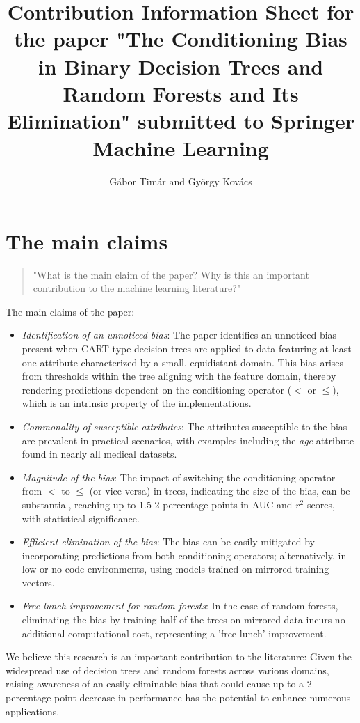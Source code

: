 \documentclass{article}
\title{Contribution Information Sheet for the paper "The Conditioning Bias in Binary Decision Trees and Random Forests and Its Elimination" submitted to Springer Machine Learning}
\author{G\'abor Tim\'ar and Gy\"orgy Kov\'acs}
\begin{document}
\maketitle

\section{The main claims}

\begin{quote}
    "What is the main claim of the paper? Why is this an important contribution to the machine learning literature?"
\end{quote}
The main claims of the paper:
\begin{itemize}
\item \emph{Identification of an unnoticed bias}: The paper identifies an unnoticed bias present when CART-type decision trees are applied to data featuring at least one attribute characterized by a small, equidistant domain. This bias arises from thresholds within the tree aligning with the feature domain, thereby rendering predictions dependent on the conditioning operator ($<$ or $\leq$), which is an intrinsic property of the implementations. 
\item \emph{Commonality of susceptible attributes}: The attributes susceptible to the bias are prevalent in practical scenarios, with examples including the \emph{age} attribute found in nearly all medical datasets.
\item \emph{Magnitude of the bias}: The impact of switching the conditioning operator from $<$ to $\leq$ (or vice versa) in trees, indicating the size of the bias, can be substantial, reaching up to 1.5-2 percentage points in AUC and $r^2$ scores, with statistical significance. 
\item \emph{Efficient elimination of the bias}: The bias can be easily mitigated by incorporating predictions from both conditioning operators; alternatively, in low or no-code environments, using models trained on mirrored training vectors.
\item \emph{Free lunch improvement for random forests}: In the case of random forests, eliminating the bias by training half of the trees on mirrored data incurs no additional computational cost, representing a 'free lunch' improvement.
\end{itemize}

We believe this research is an important contribution to the literature: Given the widespread use of decision trees and random forests across various domains, raising awareness of an easily eliminable bias that could cause up to a 2 percentage point decrease in performance has the potential to enhance numerous applications.
\end{document}
